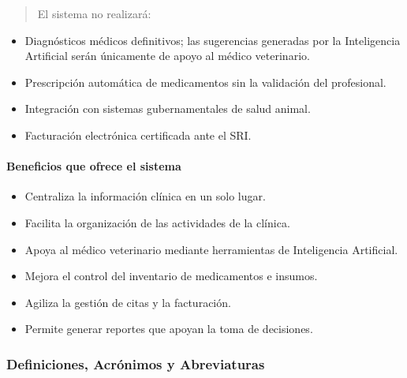 \documentclass[
]{article}
\begin{document}
\begin{quote}
El sistema no realizará:
\end{quote}

\begin{itemize}
\item
  Diagnósticos médicos definitivos; las sugerencias generadas por la
  Inteligencia Artificial serán únicamente de apoyo al médico
  veterinario.
\item
  Prescripción automática de medicamentos sin la validación del
  profesional.
\item
  Integración con sistemas gubernamentales de salud animal.
\item
  Facturación electrónica certificada ante el SRI.
\end{itemize}

\paragraph{Beneficios que ofrece el
sistema}\label{beneficios-que-ofrece-el-sistema}

\begin{itemize}
\item
  Centraliza la información clínica en un solo lugar.
\item
  Facilita la organización de las actividades de la clínica.
\item
  Apoya al médico veterinario mediante herramientas de Inteligencia
  Artificial.
\item
  Mejora el control del inventario de medicamentos e insumos.
\item
  Agiliza la gestión de citas y la facturación.
\item
  Permite generar reportes que apoyan la toma de decisiones.
\end{itemize}

\subsubsection{Definiciones, Acrónimos y
Abreviaturas}\label{definiciones-acruxf3nimos-y-abreviaturas}
\end{document}
